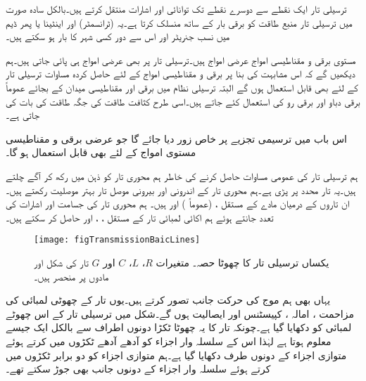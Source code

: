 ترسیلی تار ایک نقطے سے  دوسرے نقطے تک توانائی اور اشارات منتقل کرتے ہیں۔بالکل سادہ صورت میں ترسیلی تار منبع طاقت کو برقی بار کے ساتھ منسلک کرتا ہے۔یہ  (ٹرانسمٹر)  اور اینٹینا یا پھر ڈیم میں نسب جنریٹر اور اس سے دور کسی شہر کا بار ہو سکتے ہیں۔

مستوی برقی و مقناطیسی امواج عرضی امواج ہیں۔ترسیلی تار پر بھی عرضی امواج ہی پائی جاتی ہیں۔ہم دیکھیں گے کہ اس مشابہت کی بنا پر برقی و مقناطیسی امواج کے لئے حاصل کردہ مساوات ترسیلی تار کے لئے بھی قابل استعمال ہوں گے البتہ ترسیلی نظام میں برقی اور مقناطیسی میدان کے بجائے عموماً برقی دباو اور برقی رو کی استعمال کئے جاتے ہیں۔اسی طرح کثافت طاقت کی جگہ طاقت کی بات کی جاتی ہے۔

اس باب میں ترسیمی تجزیے پر خاص زور  دیا جائے گا جو عرضی برقی و مقناطیسی مستوی امواج کے لئے بھی قابل استعمال ہو گا۔ 

ہم ترسیلی تار کی عمومی مساوات حاصل کرنے کی خاطر ہم محوری تار کو ذہن میں رکھ کر آگے چلتے ہیں۔یہ تار  محدد پر پڑی ہے۔ہم محوری تار کے اندرونی اور بیرونی موصل تار بہتر موصلیت  رکھتے ہیں۔ان تاروں کے درمیان  مادے کے مستقل ،  (عموماً ) اور  ہیں۔ 
ہم محوری تار کی جسامت اور اشارات کی تعدد جانتے ہوئے ہم اکائی لمبائی تار کے مستقل ، ،  اور  حاصل کر سکتے ہیں۔

\begin{figure}
\centering
\texttt{[image: figTransmissionBaicLines]}
\caption{یکساں ترسیلی تار کا چھوٹا حصہ۔ متغیرات $R$، $L$، $C$ اور $G$ تار کی شکل اور مادوں پر منحصر ہیں۔}
\label{شکل_ترسیل_سادہ_نظام}
\end{figure}

یہاں بھی ہم موج کی حرکت  جانب تصور کرتے ہیں۔یوں تار کے چھوٹی لمبائی  کی مزاحمت ، امالہ ، کپیسٹنس  اور ایصالیت  ہوں گے۔شکل  میں ترسیلی تار کے اس چھوٹے لمبائی کو دکھایا گیا ہے۔چونکہ تار کا یہ چھوٹا ٹکڑا دونوں اطراف سے بالکل ایک جیسے معلوم ہوتا ہے  لہٰذا اس کے سلسلہ وار اجزاء کو آدھے آدھے ٹکڑوں میں کرتے ہوئے متوازی اجزاء کے دونوں طرف دکھایا گیا ہے۔ہم متوازی اجزاء کو دو برابر ٹکڑوں میں کرتے ہوئے سلسلہ وار اجزاء کے دونوں جانب بھی جوڑ سکتے تھے۔


